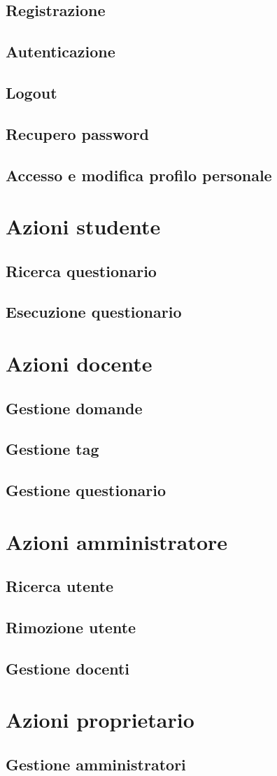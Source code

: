 \documentclass[12pt,a4paper]{article}
\begin{document}
	\subsection{Registrazione}
	\subsection{Autenticazione}
	\subsection{Logout}
	\subsection{Recupero password}
	\subsection{Accesso e modifica profilo personale}
	\section{Azioni studente}
	\subsection{Ricerca questionario}
	\subsection{Esecuzione questionario}
	\section{Azioni docente}
    \subsection{Gestione domande}
	\subsection{Gestione tag}
	\subsection{Gestione questionario}
	\section{Azioni amministratore}
	\subsection{Ricerca utente}
	\subsection{Rimozione utente}
	\subsection{Gestione docenti}
	\section{Azioni proprietario}
	\subsection{Gestione  amministratori}
	
	
	


	
\end{document}
